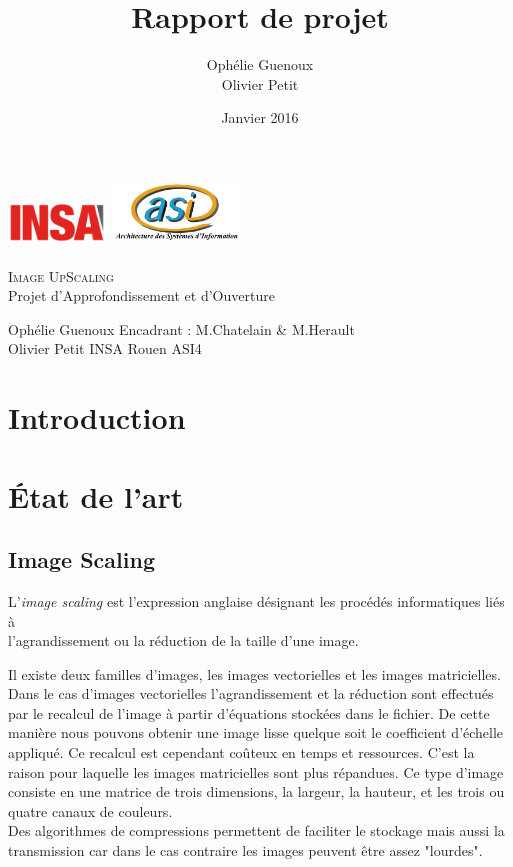 \documentclass[12pt, a4paper]{article}
\title{Rapport de projet}
\author{Ophélie Guenoux \\Olivier Petit}
\date{Janvier 2016}
\begin{document}
\makeatletter
\begin{titlepage}
  \begin{center}
      \includegraphics[width=0.20\textwidth]{Images/Logo_INSA.png}
      \hfill
      \includegraphics[width=0.25\textwidth]{Images/logoasi.png}\\
    \vspace{1cm}
		\Huge \underline{\@title} 
			\\ \textsc{Image UpScaling}
			\\ \Large Projet d'Approfondissement et d'Ouverture
			\vspace{1cm}
			\begin{figure}[h!]
				\centering
			\end{figure}
	\vspace{1cm}
	\end{center}
	\raggedright
	\large Ophélie Guenoux \hfill Encadrant : M.Chatelain \& M.Herault
	\\Olivier Petit \hfill INSA Rouen ASI4
	
\end{titlepage}

\newpage
\tableofcontents
\newpage
\section*{Introduction}

\section{État de l'art}

\subsection{Image Scaling}
L'\textit{image scaling} est l'expression anglaise désignant les procédés informatiques liés à \\
l'agrandissement ou la réduction de la taille d'une image.

Il existe deux familles d'images, les images vectorielles et les images matricielles. Dans le cas d'images vectorielles l'agrandissement et la réduction sont effectués par le recalcul de l'image à partir d'équations stockées dans le fichier. De cette manière nous pouvons obtenir une image lisse quelque soit le coefficient d'échelle appliqué. Ce recalcul est cependant coûteux en temps et ressources. C'est la raison pour laquelle les images matricielles sont plus répandues. Ce type d'image consiste en une matrice de trois dimensions, la largeur, la hauteur, et les trois ou quatre canaux de couleurs. \\Des algorithmes de compressions permettent de faciliter le stockage mais aussi la transmission car dans le cas contraire les images peuvent être assez "lourdes".
\end{document}

